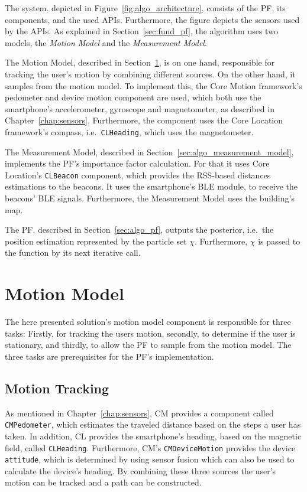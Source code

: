 The system, depicted in Figure~\ref{fig:algo_architecture}, consists of the \ac{PF}, its components, and the used \acsp{API}. Furthermore, the figure depicts the sensors used by the \acsp{API}. As explained in Section~\ref{sec:fund_pf}, the algorithm uses two models, the \emph{Motion Model} and the \emph{Measurement Model}.

The Motion Model, described in Section~\ref{sec:algo_motion_model}, is on one hand, responsible for tracking the user's motion by combining different sources. On the other hand, it samples from the motion model. To implement this, the Core Motion framework's pedometer and device motion component are used, which both use the smartphone's accelerometer, gyroscope and magnetometer, as described in Chapter~\ref{chap:sensors}. Furthermore, the component uses the Core Location framework's compass, i.e.\ \texttt{CLHeading}, which uses the magnetometer.

The Measurement Model, described in Section~\ref{sec:algo_measurement_model}, implements the \acs{PF}'s importance factor calculation. For that it uses Core Location's \texttt{CLBeacon} component, which provides the \acs{RSS}-based distances estimations to the beacons. It uses the smartphone's \acf{BLE} module, to receive the beacons' \ac{BLE} signals. Furthermore, the Measurement Model uses the building's map.

The \acl{PF}, described in Section~\ref{sec:algo_pf}, outputs the posterior, i.e.\ the position estimation represented by the particle set $\chi$. Furthermore, $\chi$ is passed to the function by its next iterative call.


\section{Motion Model}\label{sec:algo_motion_model}
The here presented solution's motion model component is responsible for three tasks: Firstly, for tracking the users motion, secondly, to determine if the user is stationary, and thirdly, to allow the \acs{PF} to sample from the motion model. The three tasks are prerequisites for the \acs{PF}'s implementation.

\subsection{Motion Tracking}
As mentioned in Chapter~\ref{chap:sensors}, \acl{CM} provides a component called \texttt{CMPedometer}, which estimates the traveled distance based on the steps a user has taken. In addition, \acl{CL} provides the smartphone's heading, based on the magnetic field, called \texttt{CLHeading}. Furthermore, \ac{CM}'s \texttt{CMDeviceMotion} provides the device \texttt{attitude}, which is determined by using sensor fusion which can also be used to calculate the device's heading. By combining these three sources the user's motion can be tracked and a path can be constructed.

